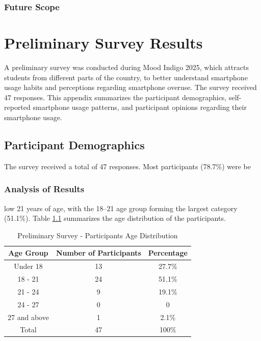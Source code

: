 \documentclass[11pt]{report}
\begin{document}
\subsection{Future Scope}

\newpage
\appendix

\chapter{Preliminary Survey Results}
\label{app:preliminary_survey}
A preliminary survey was conducted during Mood Indigo 2025, which attracts students 
from different parts of the country, to better understand smartphone usage habits and 
perceptions regarding smartphone overuse. The survey received 47 responses. 
This appendix summarizes the participant demographics, self-reported smartphone 
usage patterns, and participant opinions regarding their smartphone usage.

\section{Participant Demographics}

The survey received a total of 47 responses. Most participants (78.7\%) were be\subsection{Analysis of Results}low 21 
years of age, with the 18--21 age group forming the largest category (51.1\%). 
Table \ref{tab:Preliminary_Survey_Participants_Age_Distribution} summarizes the age 
distribution of the participants.

\begin{table}[ht]
  \centering
  \begin{tabular}{|c|c|c|}\hline
    Age Group&  Number of Participants& Percentage\\\hline
    Under 18&  13& 27.7\%\\\hline
    18 - 21&  24& 51.1\%\\\hline
    21 - 24&  9& 19.1\%\\\hline
    24 - 27&  0& 0\\\hline
    27 and above&  1& 2.1\%\\ \hline
    Total& 47&100\%\\\hline
  \end{tabular}
  \caption{Preliminary Survey - Participants Age Distribution}
  \label{tab:Preliminary_Survey_Participants_Age_Distribution}
\end{table}
\end{document}
